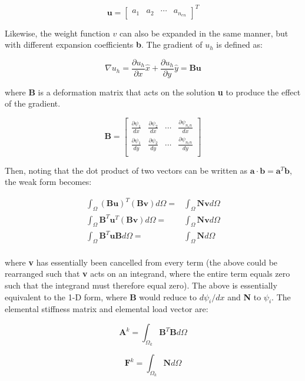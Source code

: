 \documentclass[10pt]{article}
\newcommand{\beq}{\begin{equation}}
\newcommand{\eeq}{\end{equation}}
\newcommand{\beqa}{\begin{equation}\begin{aligned}}
\newcommand{\eeqa}{\end{aligned}\end{equation}}
\begin{document}
\beq
\textbf{u}=\begin{bmatrix} a_1 & a_2 & \cdots & a_{n_{en}}\end{bmatrix}^T
\eeq

Likewise, the weight function \(v\) can also be expanded in the same manner, but with different expansion coefficients \textbf{b}. The gradient of \(u_h\) is defined as:

\beq
\nabla u_h=\frac{\partial u_h}{\partial x}\hat{x}+\frac{\partial u_h}{\partial y}\hat{y}=\textbf{B}\textbf{u}
\eeq

where \textbf{B} is a deformation matrix that acts on the solution \textbf{u} to produce the effect of the gradient. 

\beq
\textbf{B}=\begin{bmatrix}
\frac{\partial\psi_1}{dx} & \frac{\partial\psi_2}{dx} & \cdots & \frac{\partial\psi_{n_en}}{dx}\\
\frac{\partial\psi_1}{dy} & \frac{\partial\psi_2}{dy} & \cdots & \frac{\partial\psi_{n_en}}{dy}\\
\end{bmatrix}
\eeq

Then, noting that the dot product of two vectors can be written as \(\textbf{a}\cdot\textbf{b}=\textbf{a}^T\textbf{b}\), the weak form becomes:

\beqa
\int_\Omega (\textbf{B}\textbf{u})^T(\textbf{B}\textbf{v})d\Omega=&\int_\Omega \textbf{N}\textbf{v}d\Omega\\
\int_\Omega \textbf{B}^T\textbf{u}^T(\textbf{B}\textbf{v})d\Omega=&\int_\Omega \textbf{N}\textbf{v}d\Omega\\
\int_\Omega \textbf{B}^T\textbf{u}\textbf{B}d\Omega=&\int_\Omega \textbf{N}d\Omega\\
\eeqa

where \textbf{v} has essentially been cancelled from every term (the above could be rearranged such that \textbf{v} acts on an integrand, where the entire term equals zero such that the integrand must therefore equal zero). The above is essentially equivalent to the 1-D form, where \textbf{B} would reduce to \(d\psi_i/dx\) and \textbf{N} to \(\psi_i\). The elemental stiffness matrix and elemental load vector are:

\beq
\label{eq:20}
\textbf{A}^k=\int_{\Omega_k} \textbf{B}^T\textbf{B}d\Omega
\eeq

\beq
\label{eq:21}
\textbf{F}^k=\int_{\Omega_k} \textbf{N}d\Omega
\eeq
\end{document}
